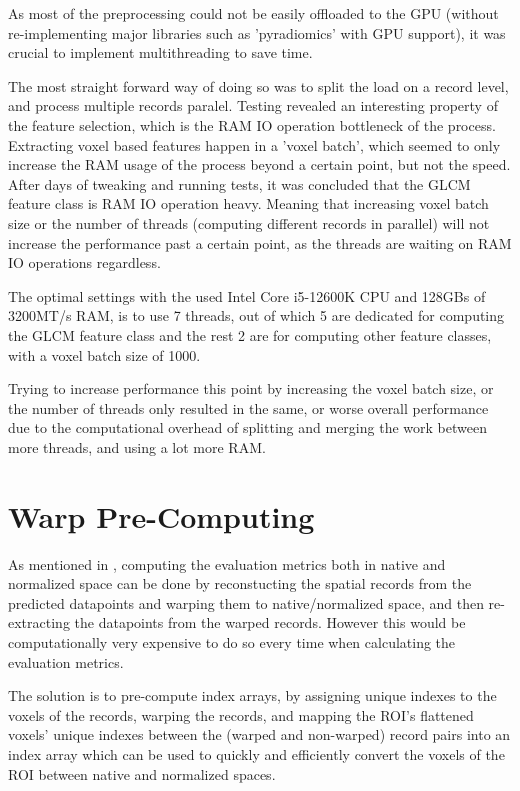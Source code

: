 As most of the preprocessing could not be easily offloaded to the GPU (without re-implementing major libraries such as 'pyradiomics' with GPU support), it was crucial to implement multithreading to save time.\par
The most straight forward way of doing so was to split the load on a record level, and process multiple records paralel. Testing revealed an interesting property of the feature selection, which is the RAM IO operation bottleneck of the process. Extracting voxel based features happen in a 'voxel batch', which seemed to only increase the RAM usage of the process beyond a certain point, but not the speed. After days of tweaking and running tests, it was concluded that the \ac{GLCM} feature class is RAM IO operation heavy. Meaning that increasing voxel batch size or the number of threads (computing different records in parallel) will not increase the performance past a certain point, as the threads are waiting on RAM IO operations regardless.\par
The optimal settings with the used Intel Core i5-12600K CPU and 128GBs of 3200MT/s RAM, is to use 7 threads, out of which 5 are dedicated for computing the \ac{GLCM} feature class and the rest 2 are for computing other feature classes, with a voxel batch size of 1000.\par
Trying to increase performance this point by increasing the voxel batch size, or the number of threads only resulted in the same, or worse overall performance due to the computational overhead of splitting and merging the work between more threads, and using a lot more RAM.

\section{Warp Pre-Computing}
\label{app:imp-pre}

As mentioned in , computing the evaluation metrics both in native and normalized space can be done by reconstucting the spatial records from the predicted datapoints and warping them to native/normalized space, and then re-extracting the datapoints from the warped records. However this would be computationally very expensive to do so every time when calculating the evaluation metrics.\par
The solution is to pre-compute index arrays, by assigning unique indexes to the voxels of the records, warping the records, and mapping the \ac{ROI}'s flattened voxels' unique indexes between the (warped and non-warped) record pairs into an index array which can be used to quickly and efficiently convert the voxels of the \ac{ROI} between native and normalized spaces.

